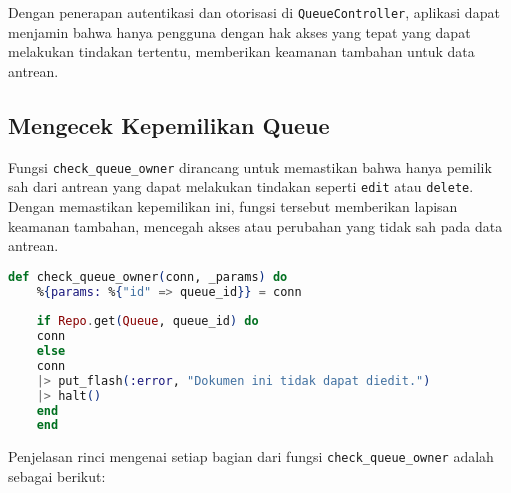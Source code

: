 Dengan penerapan autentikasi dan otorisasi di \texttt{QueueController}, aplikasi dapat menjamin bahwa hanya pengguna dengan hak akses yang tepat yang dapat melakukan tindakan tertentu, memberikan keamanan tambahan untuk data antrean.


\subsection{Mengecek Kepemilikan Queue}
Fungsi \texttt{check\_queue\_owner} dirancang untuk memastikan bahwa hanya pemilik sah dari antrean yang dapat melakukan tindakan seperti \texttt{edit} atau \texttt{delete}. Dengan memastikan kepemilikan ini, fungsi tersebut memberikan lapisan keamanan tambahan, mencegah akses atau perubahan yang tidak sah pada data antrean.

\begin{lstlisting}[language=Elixir, caption={\texttt{lib/hello\_web/controllers/queue\_controller.ex}}]
	def check_queue_owner(conn, _params) do
	%{params: %{"id" => queue_id}} = conn
	
	if Repo.get(Queue, queue_id) do
	conn
	else
	conn
	|> put_flash(:error, "Dokumen ini tidak dapat diedit.")
	|> halt()
	end
	end
\end{lstlisting}

Penjelasan rinci mengenai setiap bagian dari fungsi \texttt{check\_queue\_owner} adalah sebagai berikut:

